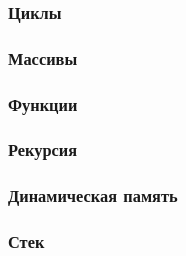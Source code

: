 \documentclass[12pt]{matmex-diploma}
\begin{document}
    \subsubsection*{Циклы}
    
    \subsubsection*{Массивы}
    
    \subsubsection*{Функции}
    
    \subsubsection*{Рекурсия}
    
    \subsubsection*{Динамическая память}
    
    \subsubsection*{Стек}
\end{document}
